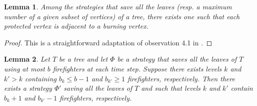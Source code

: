 \documentclass[10pt]{article}
\newcommand{\qedfill}[0]{ }
\newtheorem{lemma}{Lemma}
\begin{document}
\begin{lemma}
\label{lem:adj}
Among the strategies that save all the leaves (resp. a maximum number of a given subset of vertices) of a tree, there exists one such that each protected vertex is adjacent to a burning vertex.
\end{lemma}

\begin{proof}
This is a straightforward adaptation of observation 4.1 in \cite{macgillivray2003}.\qedfill
\end{proof}



\begin{lemma}
\label{lem:room}
Let $T$ be a tree and let $\Phi$ be a strategy that saves all the leaves of $T$ using at most $b$ firefighters at each time step. Suppose there exists levels $k$ and $k' > k$ containing $b_{k} \leq b-1$ and $b_{k'} \geq 1$ firefighters, respectively. Then there exists a strategy $\Phi'$ saving all the leaves of $T$ and such that levels $k$ and $k'$ contain $b_{k}+1$ and $b_{k'}-1$ firefighters, respectively.
\end{lemma}
\end{document}
